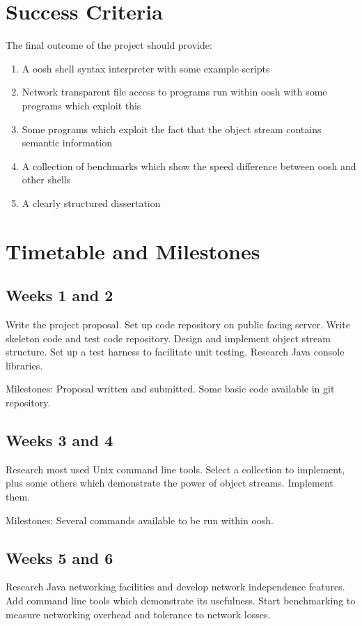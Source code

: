 \documentclass[12pt]{article}
\begin{document}
\section*{Success Criteria}
The final outcome of the project should provide:

\begin{enumerate}
\item A oosh shell syntax interpreter with some example scripts
\item Network transparent file access to programs run within oosh with
  some programs which exploit this
\item Some programs which exploit the fact that the object stream
  contains semantic information
\item A collection of benchmarks which show the speed difference
  between oosh and other shells
\item A clearly structured dissertation
\end{enumerate}

\section*{Timetable and Milestones}

\subsection*{Weeks 1 and 2}
Write the project proposal. Set up code repository on public facing
server. Write skeleton code and test code repository. Design and
implement object stream structure. Set up a test harness to facilitate
unit testing. Research Java console libraries.

Milestones: Proposal written and submitted. Some basic code available
in git repository.

\subsection*{Weeks 3 and 4}
Research most used Unix command line tools. Select a collection to
implement, plus some others which demonstrate the power of object
streams. Implement them.

Milestones: Several commands available to be run within oosh.

\subsection*{Weeks 5 and 6}
Research Java networking facilities and develop network independence
features. Add command line tools which demonstrate its
usefulness. Start benchmarking to measure networking overhead and
tolerance to network losses.
\end{document}
